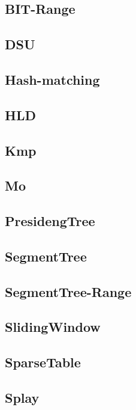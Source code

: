 \documentclass{article}
\begin{document}
\subsection{BIT-Range}

\subsection{DSU}

\subsection{Hash-matching}

\subsection{HLD}

\subsection{Kmp}

\subsection{Mo}

\subsection{PresidengTree}

\subsection{SegmentTree}

\subsection{SegmentTree-Range}

\subsection{SlidingWindow}

\subsection{SparseTable}

\subsection{Splay}

\end{document}
